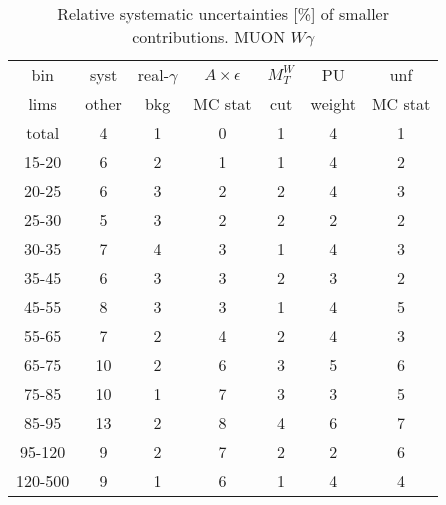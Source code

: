 \begin{table}[h]
  \scriptsize
  \begin{center}
  \caption{Relative systematic uncertainties [\%] of smaller contributions. MUON $W\gamma$}
  \begin{tabular}{|c|c|c|c|c|c|c|}
    bin  & syst & real-$\gamma$ & $A\times\epsilon$ & $M_T^W$ & PU & unf\\
    lims  & other & bkg & MC stat & cut & weight & MC stat\\ \hline
    total  & 4 & 1 & 0 & 1 & 4 & 1 \\ \hline
    15-20 & 6 & 2 & 1 & 1 & 4 & 2 \\ \hline
    20-25 & 6 & 3 & 2 & 2 & 4 & 3 \\ \hline
    25-30 & 5 & 3 & 2 & 2 & 2 & 2 \\ \hline
    30-35 & 7 & 4 & 3 & 1 & 4 & 3 \\ \hline
    35-45 & 6 & 3 & 3 & 2 & 3 & 2 \\ \hline
    45-55 & 8 & 3 & 3 & 1 & 4 & 5 \\ \hline
    55-65 & 7 & 2 & 4 & 2 & 4 & 3 \\ \hline
    65-75 & 10 & 2 & 6 & 3 & 5 & 6 \\ \hline
    75-85 & 10 & 1 & 7 & 3 & 3 & 5 \\ \hline
    85-95 & 13 & 2 & 8 & 4 & 6 & 7 \\ \hline
    95-120 & 9 & 2 & 7 & 2 & 2 & 6 \\ \hline
    120-500 & 9 & 1 & 6 & 1 & 4 & 4 \\ \hline
  \end{tabular}
  \label{tab:systInPercentSmallSysts_MUON_WGamma}
  \end{center}
\end{table}

